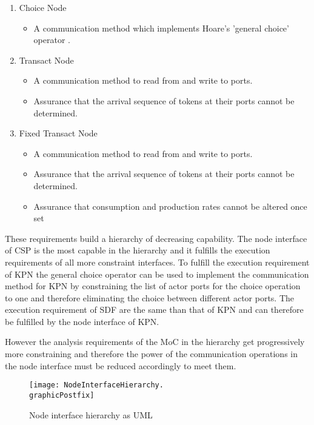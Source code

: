 \begin{enumerate}
\item Choice Node
  \begin{itemize}
  \item  A communication method which implements Hoare's 'general choice' operator \cite{csphoare:1985}.
  \end  {itemize}
\item Transact Node
  \begin{itemize}
  \item A communication method to read from and write to ports.
  \item Assurance that the arrival sequence of tokens at
        their ports cannot be determined.
  \end  {itemize}
\item Fixed Transact Node
  \begin{itemize}
  \item A communication method to read from and write to ports.
  \item Assurance that the arrival sequence of tokens at
        their ports cannot be determined.
  \item Assurance that consumption and production rates cannot
        be altered once set
  \end  {itemize}
\end{enumerate}

These requirements build a hierarchy of decreasing capability. The node
interface of CSP is the most capable in the hierarchy and it
fulfills the execution requirements of all more constraint interfaces.
To fulfill the execution requirement of KPN the general choice operator
can be used to implement the communication method for KPN by constraining
the list of actor ports for the choice operation to one and therefore
eliminating the choice between different actor ports.
The execution requirement of SDF are the same than that of KPN and can
therefore be fulfilled by the node interface of KPN.

However the analysis requirements of the MoC in the hierarchy
get progressively more constraining and therefore the power
of the communication operations in the node interface must
be reduced accordingly to meet them.

\begin{figure}
\centering
\texttt{[image: NodeInterfaceHierarchy.\\graphicPostfix]}\\
\caption{\label{node-interface-hierarchy}Node interface hierarchy as UML}
\end{figure}

